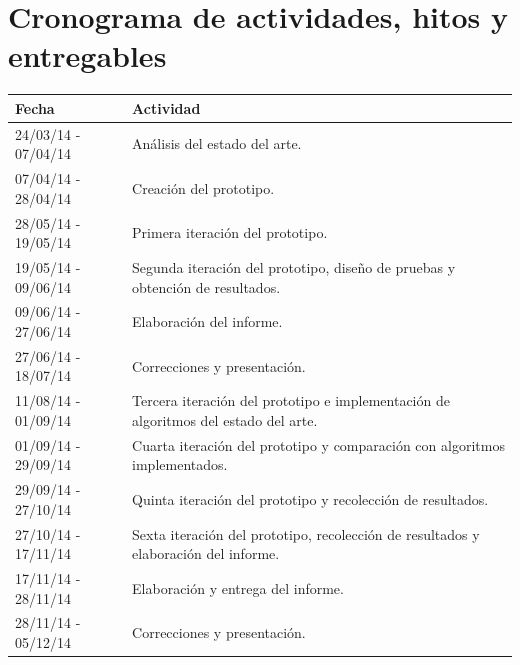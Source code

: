 \documentclass{article}
\begin{document}
\section{Cronograma de actividades, hitos y entregables}
\begin{tabular}{ll}

\hline\noalign{\smallskip}

Fecha & Actividad \\

\hline\noalign{\smallskip}

24/03/14 - 07/04/14 & Análisis del estado del arte.\\

07/04/14 - 28/04/14 & Creación del prototipo.\\

28/05/14 - 19/05/14 & Primera iteración del prototipo.\\

19/05/14 - 09/06/14 & Segunda iteración del prototipo, diseño de pruebas y obtención de resultados.\\

09/06/14 - 27/06/14 & Elaboración del informe.\\

27/06/14 - 18/07/14 & Correcciones y presentación.\\

11/08/14 - 01/09/14 & Tercera iteración del prototipo e implementación de algoritmos del estado del arte.\\

01/09/14 - 29/09/14 & Cuarta iteración del prototipo y comparación con algoritmos implementados.\\

29/09/14 - 27/10/14 & Quinta iteración del prototipo y recolección de resultados.\\

27/10/14 - 17/11/14 & Sexta iteración del prototipo, recolección de resultados y elaboración del informe.\\

17/11/14 - 28/11/14 & Elaboración y entrega del informe.\\

28/11/14 - 05/12/14 & Correcciones y presentación.\\
\hline


\end{tabular}
\end{document}
